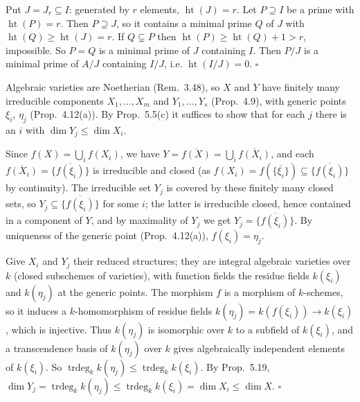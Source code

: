 \documentclass[11pt]{article}
\begin{document}
Put $J=J_r\subseteq I$: generated by $r$ elements, $\operatorname{ht}(J)=r$. Let $P\supseteq I$ be a prime with $\operatorname{ht}(P)=r$. Then $P\supseteq J$, so it contains a minimal prime $Q$ of $J$ with $\operatorname{ht}(Q)\ge\operatorname{ht}(J)=r$. If $Q\subsetneq P$ then $\operatorname{ht}(P)\ge\operatorname{ht}(Q)+1>r$, impossible. So $P=Q$ is a minimal prime of $J$ containing $I$. Then $P/J$ is a minimal prime of $A/J$ containing $I/J$, i.e. $\operatorname{ht}(I/J)=0$. \hfill$\square$

\pf
Algebraic varieties are Noetherian (Rem.~3.48), so $X$ and $Y$ have finitely many irreducible components $X_1,\dots,X_m$ and $Y_1,\dots,Y_s$ (Prop.~4.9), with generic points $\xi_i$, $\eta_j$ (Prop.~4.12(a)). By Prop.~5.5(c) it suffices to show that for each $j$ there is an $i$ with $\dim Y_j\le\dim X_i$.

Since $f(X)=\bigcup_if(X_i)$, we have $Y=\overline{f(X)}=\bigcup_i\overline{f(X_i)}$, and each $\overline{f(X_i)}=\overline{\{f(\xi_i)\}}$ is irreducible and closed (as $f(X_i)=f(\overline{\{\xi_i\}})\subseteq\overline{\{f(\xi_i)\}}$ by continuity). The irreducible set $Y_j$ is covered by these finitely many closed sets, so $Y_j\subseteq\overline{\{f(\xi_i)\}}$ for some $i$; the latter is irreducible closed, hence contained in a component of $Y$, and by maximality of $Y_j$ we get $Y_j=\overline{\{f(\xi_i)\}}$. By uniqueness of the generic point (Prop.~4.12(a)), $f(\xi_i)=\eta_j$.

Give $X_i$ and $Y_j$ their reduced structures; they are integral algebraic varieties over $k$ (closed subschemes of varieties), with function fields the residue fields $k(\xi_i)$ and $k(\eta_j)$ at the generic points. The morphism $f$ is a morphism of $k$-schemes, so it induces a $k$-homomorphism of residue fields $k(\eta_j)=k(f(\xi_i))\to k(\xi_i)$, which is injective. Thus $k(\eta_j)$ is isomorphic over $k$ to a subfield of $k(\xi_i)$, and a transcendence basis of $k(\eta_j)$ over $k$ gives algebraically independent elements of $k(\xi_i)$. So $\operatorname{trdeg}_kk(\eta_j)\le\operatorname{trdeg}_kk(\xi_i)$. By Prop.~5.19, $\dim Y_j=\operatorname{trdeg}_kk(\eta_j)\le\operatorname{trdeg}_kk(\xi_i)=\dim X_i\le\dim X$. \hfill$\square$
\end{document}
